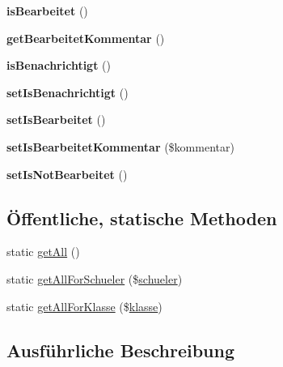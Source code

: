 \begin{DoxyCompactItemize}
{\bfseries is\+Bearbeitet} ()
\item 
\mbox{\label{class_absenz_verspaetung_a5989cc81058f5e542d915910345a9edd}} 
{\bfseries get\+Bearbeitet\+Kommentar} ()
\item 
\mbox{\label{class_absenz_verspaetung_afa4e8a8bbbf1ed02267297d74319194d}} 
{\bfseries is\+Benachrichtigt} ()
\item 
\mbox{\label{class_absenz_verspaetung_ac0b0e4988652891c2a91aa871edc84ad}} 
{\bfseries set\+Is\+Benachrichtigt} ()
\item 
\mbox{\label{class_absenz_verspaetung_a7fc18b1293e88469890f4791444daa83}} 
{\bfseries set\+Is\+Bearbeitet} ()
\item 
\mbox{\label{class_absenz_verspaetung_a6301c58c4accc1149e96cb6577214311}} 
{\bfseries set\+Is\+Bearbeitet\+Kommentar} (\$kommentar)
\item 
\mbox{\label{class_absenz_verspaetung_a4ee4fb6d38369397a1f59695a253d003}} 
{\bfseries set\+Is\+Not\+Bearbeitet} ()
\end{DoxyCompactItemize}
\subsection*{Öffentliche, statische Methoden}
\begin{DoxyCompactItemize}
\item 
static \mbox{\hyperlink{class_absenz_verspaetung_a4e6707060da5ab5f251eeb1442549504}{get\+All}} ()
\item 
static \mbox{\hyperlink{class_absenz_verspaetung_a894d4ccf9e72dd77cf6ef4150ca27cc3}{get\+All\+For\+Schueler}} (\$\mbox{\hyperlink{classschueler}{schueler}})
\item 
static \mbox{\hyperlink{class_absenz_verspaetung_a331e406cd5dd43766e1bdff887e685f7}{get\+All\+For\+Klasse}} (\$\mbox{\hyperlink{classklasse}{klasse}})
\end{DoxyCompactItemize}


\subsection{Ausführliche Beschreibung}


